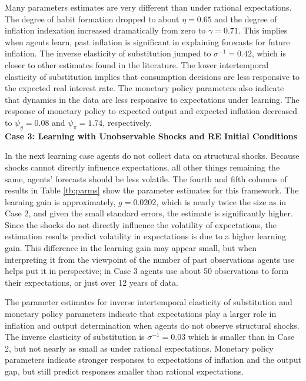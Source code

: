 Many parameters estimates are very different than under rational expectations.  The degree of habit formation dropped to about $\eta=0.65$ and the degree of inflation indexation increased dramatically from zero to $\gamma=0.71$.  This implies when agents learn, past inflation is significant in explaining forecasts for future inflation.  The inverse elasticity of substitution jumped to $\sigma^{-1} = 0.42$, which is closer to other estimates found in the literature.  The lower intertemporal elasticity of substitution implies that consumption decisions are less responsive to the expected real interest rate.  The monetary policy parameters also indicate that dynamics in the data are less responsive to expectations under learning.  The response of monetary policy to expected output and expected inflation decreased to $\psi_y=0.08$ and $\psi_{\pi}=1.74$, respectively. \\

\noindent \textbf{Case 3:  Learning with Unobservable Shocks and RE Initial Conditions}

In the next learning case agents do not collect data on structural shocks.  Because shocks cannot directly influence expectations, all other things remaining the same, agents' forecasts should be less volatile.  The fourth and fifth columns of results in Table \ref{tb:parms} show the parameter estimates for this framework.  The learning gain is approximately, $g=0.0202$, which is nearly twice the size as in Case 2, and given the small standard errors, the estimate is significantly higher.  Since the shocks do not directly influence the volatility of expectations, the estimation results predict volatility in expectations is due to a higher learning gain.  This difference in the learning gain may appear small, but when interpreting it from the viewpoint of the number of past observations agents use helps put it in perspective; in Case 3 agents use about 50 observations to form their expectations, or just over 12 years of data.

The parameter estimates for inverse intertemporal elasticity of substitution and monetary policy parameters indicate that expectations play a larger role in inflation and output determination when agents do not observe structural shocks.  The inverse elasticity of substitution is $\sigma^{-1}=0.03$ which is smaller than in Case 2, but not nearly as small as under rational expectations.  Monetary policy parameters indicate stronger responses to expectations of inflation and the output gap, but still predict responses smaller than rational expectations.  

